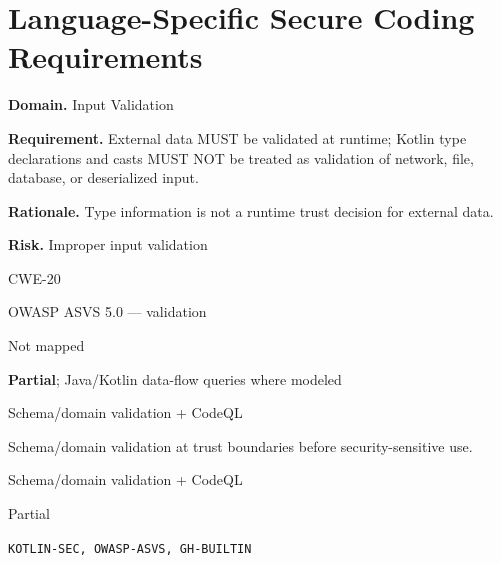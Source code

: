 \documentclass[10pt,letterpaper]{article}
\newcommand{\prioritybadge}[2]{\tcbox[on line,boxrule=0pt,arc=1.2mm,boxsep=0.7mm,left=1mm,right=1mm,top=0.4mm,bottom=0.4mm,colback=#2!12,coltext=#2]{\scriptsize\bfseries #1}}
\begin{document}
\section{Language-Specific Secure Coding Requirements}
\begin{rulebox}[title={\texttt{SCS-KOTLIN-INPUT-001} \hfill \prioritybadge{High Priority}{High}}]
\textbf{Domain.} Input Validation

\textbf{Requirement.} External data MUST be validated at runtime; Kotlin type declarations and casts MUST NOT be treated as validation of network, file, database, or deserialized input.

\textbf{Rationale.} Type information is not a runtime trust decision for external data.

\textbf{Risk.} Improper input validation

\begin{description}[leftmargin=2.65cm,labelwidth=2.3cm,style=nextline,itemsep=1pt,topsep=3pt]
  \item[CWE] CWE-20
  \item[OWASP] OWASP ASVS 5.0 --- validation
  \item[CERT] Not mapped
  \item[CodeQL] \textbf{Partial}; Java/Kotlin data-flow queries where modeled
  \item[Enforcement] Schema/domain validation + CodeQL
  \item[Prevention] Schema/domain validation at trust boundaries before security-sensitive use.
  \item[Verification] Schema/domain validation + CodeQL
  \item[Automation] Partial
  \item[Sources] \texttt{KOTLIN-SEC, OWASP-ASVS, GH-BUILTIN}
\end{description}
\end{rulebox}
\end{document}
